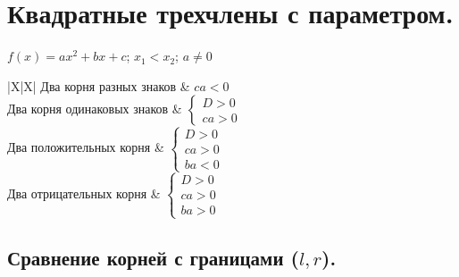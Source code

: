 \documentclass[12pt]{article}
\begin{document}
	\section{Квадратные трехчлены с параметром.}
	
	$f(x) = ax^2 + bx + c$; $x_1 < x_2$; $a \neq 0$
	
	\begin{xltabular}{\textwidth}{|X|X|}
		\hline
		Два корня разных знаков & $ca < 0$\\
		\hline
		Два корня одинаковых знаков & $\begin{cases}
			D > 0\\
			ca > 0
		\end{cases}$\\
		\hline
		Два положительных корня & $\begin{cases}
			D > 0\\
			ca > 0\\
			ba < 0
		\end{cases}$\\
		\hline
		Два отрицательных корня & $\begin{cases}
			D > 0\\
			ca > 0\\
			ba > 0
		\end{cases}$\\
		\hline
	\end{xltabular}
	
	\subsection{Сравнение корней с границами ($l, r$).}
	
\end{document}
